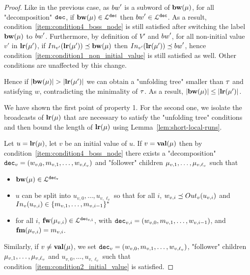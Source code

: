\begin{proof}
	Like in the previous case, as $\bossspec'$ is a subword of $\mathbf{bw}(\mu)$, for all "decomposition" $\mathtt{dec}$, if $\mathbf{bw}(\mu) \in \mathcal{L}^{\mathtt{\mathtt{dec}}}$ then $\bossspec' \in \langdec{\decsymb}$. As a result, condition~\ref{item:condition4_boss_node} is still satisfied after switching the label $\mathbf{bw}(\mu)$ to $\bossspec'$. Furthermore, by definition of $V'$ and $\bossspec'$, for all non-initial value $v'$ in $\mathbf{lr}(\mu')$, if $\vinput{v'}{\localrunlabel{\node'}} \subword \bosslabel{\node}$ then  $\vinput{v'}{\localrunlabel{\node'}} \subword \bossspec'$, hence condition~\ref{item:condition1_non_initial_value} is still satisfied as well. Other conditions are unaffected by this change.
	
	Hence if $|\mathbf{bw}(\mu)| > |\mathbf{lr}(\mu')|$ we can obtain a "unfolding tree" smaller than $\tau$ and satisfying $w$, contradicting the minimality of $\tau$. As a result, $|\mathbf{bw}(\mu)| \leq |\mathbf{lr}(\mu')|$.
	
	We have shown the first point of property 1. For the second one, we isolate the broadcasts of $\mathbf{lr}(\mu)$ that are necessary to satisfy the "unfolding tree" conditions and then bound the length of $\mathbf{lr}(\mu)$ using Lemma~\ref{lem:short-local-runs}.
	
	Let $u = \mathbf{lr}(\mu)$, let $v$ be an initial value of $u$. If $v = \mathbf{val}(\mu)$ then by condition~\ref{item:condition4_boss_node} there exists a "decomposition" $\mathtt{dec}_v = (w_{v,0}, m_{v,1}, \ldots, w_{v,\ell_v})$ and "follower" children $\mu_{v,1}, \ldots, \mu_{v,\ell_v}$ such that
	\begin{itemize}
		\item $\mathbf{bw}(\mu) \in \mathcal{L}^{\mathtt{\mathtt{dec}_v}}$
		\item $u$ can be split into $u_{v,0}, \ldots, u_{v,\ell_v}$ so that for all $i$, $w_{v,i} \subword \voutput{v}{u_{v,i}}$ and $\vinput{v}{u_{v,i}} \in \set{m_{v,1}, \ldots, m_{v,i-1}}^*$
		
		\item for all $i$, $\mathbf{fw}(\mu_{v,i}) \in \mathcal{L}^{\mathtt{\mathtt{dec}_{v,i}}}$, with $\mathtt{dec}_{v,i}= (w_{v,0}, m_{v,1}, \ldots, w_{v,i-1})$, and $\mathbf{fm}(\mu_{v,i}) = m_{v,i}$.
	\end{itemize}
	
	Similarly, if $v \neq \mathbf{val}(\mu)$, we set $\mathtt{dec}_v = (w_{v,0}, m_{v,1}, \ldots, w_{v,\ell_v})$, "follower" children $\mu_{v,1}, \ldots, \mu_{v, \ell_v}$ and $u_{v,0}, \ldots, u_{v,\ell_v}$ such that condition~\ref{item:condition2_initial_value} is satisfied.
	

\end{proof}
